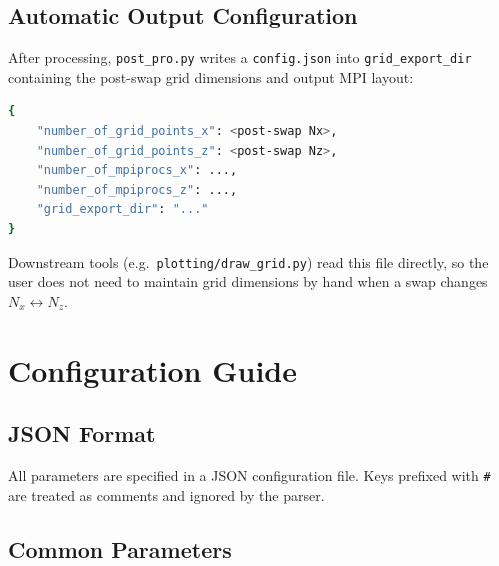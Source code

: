 \documentclass[11pt,a4paper]{report}
\begin{document}
\section{Automatic Output Configuration}

After processing, \texttt{post\_pro.py} writes a \texttt{config.json} into \texttt{grid\_export\_dir} containing the post-swap grid dimensions and output MPI layout:
\begin{lstlisting}[language=bash]
{
    "number_of_grid_points_x": <post-swap Nx>,
    "number_of_grid_points_z": <post-swap Nz>,
    "number_of_mpiprocs_x": ...,
    "number_of_mpiprocs_z": ...,
    "grid_export_dir": "..."
}
\end{lstlisting}
Downstream tools (e.g.\ \texttt{plotting/draw\_grid.py}) read this file directly, so the user does not need to maintain grid dimensions by hand when a swap changes $N_x \leftrightarrow N_z$.

\chapter{Configuration Guide}

\section{JSON Format}

All parameters are specified in a JSON configuration file. Keys prefixed with \texttt{\#} are treated as comments and ignored by the parser.

\section{Common Parameters}
\end{document}
